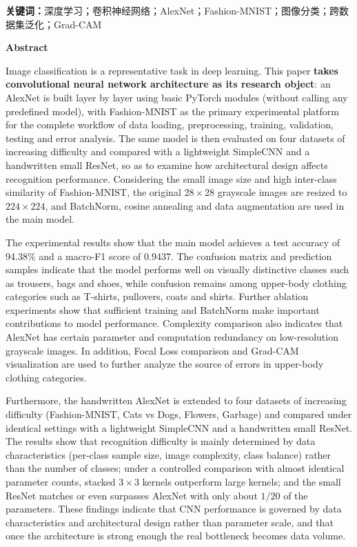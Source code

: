 \documentclass[12pt,a4paper,fontset=fandol]{ctexart}
\numberwithin{figure}{section}
\numberwithin{table}{section}
\numberwithin{equation}{section}
\begin{document}
\par\vspace{1ex}
\noindent\textbf{关键词：}深度学习；卷积神经网络；AlexNet；Fashion-MNIST；图像分类；跨数据集泛化；Grad-CAM

\newpage
\begin{center}{\Large\bfseries Abstract}\end{center}
\par Image classification is a representative task in deep learning. This paper \textbf{takes convolutional neural
network architecture as its research object}: an AlexNet is built layer by layer using basic PyTorch modules
(without calling any predefined model), with Fashion-MNIST as the primary experimental platform for the complete
workflow of data loading, preprocessing, training, validation, testing and error analysis. The same model is then
evaluated on four datasets of increasing difficulty and compared with a lightweight SimpleCNN and a handwritten
small ResNet, so as to examine how architectural design affects recognition performance. Considering the small
image size and high inter-class similarity of Fashion-MNIST, the original $28\times28$ grayscale images are resized
to $224\times224$, and BatchNorm, cosine annealing and data augmentation are used in the main model.

\par The experimental results show that the main model achieves a test accuracy of 94.38\% and a macro-F1 score of
0.9437. The confusion matrix and prediction samples indicate that the model performs well on visually distinctive
classes such as trousers, bags and shoes, while confusion remains among upper-body clothing categories such as
T-shirts, pullovers, coats and shirts. Further ablation experiments show that sufficient training and BatchNorm
make important contributions to model performance. Complexity comparison also indicates that AlexNet has certain
parameter and computation redundancy on low-resolution grayscale images. In addition, Focal Loss comparison and
Grad-CAM visualization are used to further analyze the source of errors in upper-body clothing categories.

\par Furthermore, the handwritten AlexNet is extended to four datasets of increasing difficulty (Fashion-MNIST,
Cats vs Dogs, Flowers, Garbage) and compared under identical settings with a lightweight SimpleCNN and a
handwritten small ResNet. The results show that recognition difficulty is mainly determined by data
characteristics (per-class sample size, image complexity, class balance) rather than the number of classes;
under a controlled comparison with almost identical parameter counts, stacked $3\times3$ kernels outperform
large kernels; and the small ResNet matches or even surpasses AlexNet with only about $1/20$ of the parameters.
These findings indicate that CNN performance is governed by data characteristics and architectural design rather
than parameter scale, and that once the architecture is strong enough the real bottleneck becomes data volume.
\end{document}
